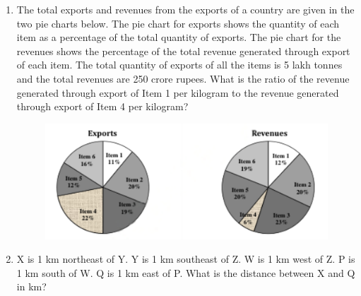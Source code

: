 \documentclass[journal,12pt,onecolumn]{IEEEtran}
\theoremstyle{remark}
\begin{document}
\begin{enumerate}
    \item The total exports and revenues from the exports of a country are given in the two pie charts below. The pie chart for exports shows the quantity of each item as a percentage of the total quantity of exports. The pie chart for the revenues shows the percentage of the total revenue generated through export of each item. The total quantity of exports of all the items is 5 lakh tonnes and the total revenues are 250 crore rupees. What is the ratio of the revenue generated through export of Item 1 per kilogram to the revenue generated through export of Item 4 per kilogram?

    \hfill{}
    \begin{figure}[H]
        \centering
        \includegraphics[width=0.8\columnwidth]{q8}
        \caption*{}
        \label{fig:q8}
    \end{figure}
        \begin{enumerate}
        \end{enumerate}

    \item X is 1 km northeast of Y. Y is 1 km southeast of Z. W is 1 km west of Z. P is 1 km south of W. Q is 1 km east of P. What is the distance between X and Q in km?

    \hfill{}
        \begin{enumerate}
        \end{enumerate}
    

\end{enumerate}
\end{document}
